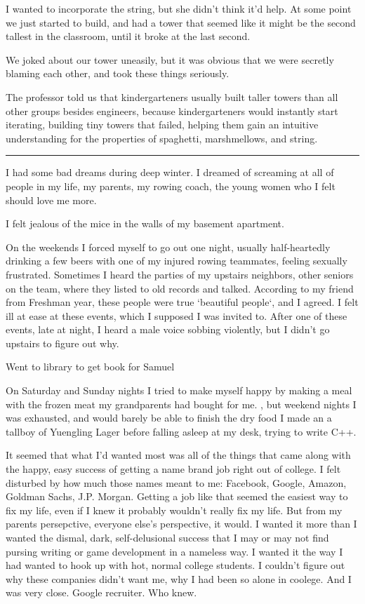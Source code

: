 I wanted to incorporate the string, but she didn't think it'd help.  At some
point we just started to build, and had a tower that seemed like it might be the
second tallest in the classroom, until it broke at the last second.

We joked about our tower uneasily, but it was obvious that we were secretly
blaming each other, and took these things seriously.

The professor told us that kindergarteners usually built taller towers than all
other groups besides engineers, because kindergarteners would instantly start
iterating, building tiny towers that failed, helping them gain an intuitive
understanding for the properties of spaghetti, marshmellows, and string. 

\plainfancybreak{12pt}{2}{* * *}

I had some bad dreams during deep winter.  I dreamed of screaming at all of
people in my life, my parents, my rowing coach, the young women who I felt
should love me more.  

I felt jealous of the mice in the walls of my basement apartment.

On the weekends I forced myself to go out one night, usually half-heartedly
drinking a few beers with one of my injured rowing teammates, feeling sexually
frustrated.  Sometimes I heard the parties of my upstairs neighbors, other
seniors on the team, where they listed to old records and talked.  According to
my friend from Freshman year, these people were true `beautiful people`, and I
agreed.  I felt ill at ease at these events, which I supposed I was invited to.
After one of these events, late at night, I heard a male voice sobbing
violently, but I didn't go upstairs to figure out why.

Went to library to get book for Samuel

On Saturday and Sunday nights I tried to make myself happy by making a meal with
the frozen meat my grandparents had bought for me.  , but weekend nights I was exhausted, and would barely
be able to finish the dry food I made an a tallboy of Yuengling Lager before
falling asleep at my desk, trying to write C++.

It seemed that what I'd wanted most was all of the things that came along with
the happy, easy success of getting a name brand job right out of college.  I
felt disturbed by how much those names meant to me: Facebook, Google, Amazon,
Goldman Sachs, J.P. Morgan.  Getting a job like that seemed the easiest way to
fix my life, even if I knew it probably wouldn't really fix my life.  But from
my parents persepctive, everyone else's perspective, it would.  I wanted it more
than I wanted the dismal, dark, self-delusional success that I may or may not
find pursing writing or game development in a nameless way.  I wanted it the way
I had wanted to hook up with hot, normal college students.  I couldn't figure
out why these companies didn't want me, why I had been so alone in coolege.  And
I was very close.  Google recruiter.  Who knew.

